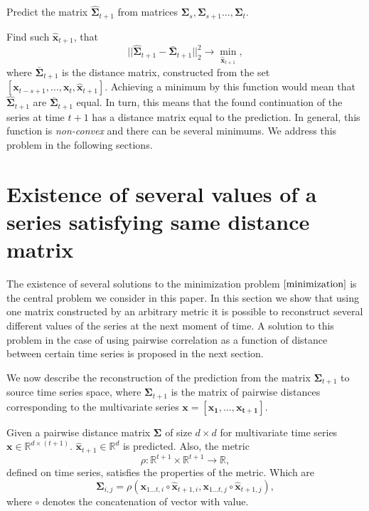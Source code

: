 \documentclass[12pt]{article}
\begin{document}
Predict the matrix $\hat{\mathbf{\Sigma}}_{t+1}$ from matrices $\mathbf{\Sigma}_s, \mathbf{\Sigma}_{s+1} \ldots, \mathbf{\Sigma}_{t}$.

Find such $\mathbf{\hat{x}}_{t+1}$, that \[ ||\hat{\mathbf{\Sigma}}_{t+1} - \bar{\mathbf{\Sigma}}_{t+1}||_2^2 \rightarrow \min_{\mathbf{\hat{x}}_{t+1}}, \tag{\textasteriskcentered} \label{minimization}\] where $\bar{\mathbf{\Sigma}}_{t+1}$ is the distance matrix, constructed from the set $[\mathbf{x}_{t-s+1}, \ldots, \mathbf{x}_{t}, \mathbf{\hat{x}}_{t+1}]$. Achieving a minimum by this function would mean that $\hat{\mathbf{\Sigma}}_{t+1}$ are $\bar{\mathbf{\Sigma}}_{t+1}$ equal. In turn, this means that the found continuation of the series at time $t+1$ has a distance matrix equal to the prediction. In general, this function is \emph{non-convex} and there can be several minimums. We address this problem in the following sections.

\section{Existence of several values of a series satisfying same distance matrix}

The existence of several solutions to the minimization problem $\eqref{minimization}$ is the central problem we consider in this paper. In this section we show that using one matrix constructed by an arbitrary metric it is possible to reconstruct several different values of the series at the next moment of time. A solution to this problem in the case of using pairwise correlation as a function of distance between certain time series is proposed in the next section.

We now describe the reconstruction of the prediction from the matrix $\mathbf{\Sigma}_{t+1}$ to source time series space, where $\mathbf{\Sigma}_{t+1}$ is the matrix of pairwise distances corresponding to the multivariate series $\mathbf{x}=[\mathbf{x_1}, \ldots, \mathbf{x_{t+1}}]$.

Given a pairwise distance matrix $\mathbf{\Sigma}$ of size $d \times d$ for multivariate time series $\mathbf{x} \in \mathbb{R}^{d \times (t+1)}$. $\hat{\mathbf{x}}_{t+1} \in \mathbb{R}^d$ is predicted. Also, the metric \[ \rho : \mathbb{R}^{t+1} \times \mathbb{R}^{t+1} \rightarrow \mathbb{R}, \] defined on time series, satisfies the properties of the metric. Which are \[\mathbf{\Sigma}_{i,j} = \rho(\mathbf{x}_{1 \ldots t, i} \circ \hat{\mathbf{x}}_{t+1, i}, \mathbf{x}_{1 \ldots t, j} \circ \hat{\mathbf{x}}_{t+1, j}),\] where $\circ$ denotes the concatenation of vector with value.
\end{document}
